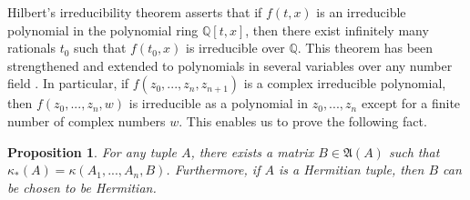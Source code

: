 \documentclass[draft, 12pt, reqno]{amsart}
\numberwithin{equation}{section}
\theoremstyle{plain}
\newtheorem{proposition}[theorem]{Proposition}
\begin{document}
Hilbert's irreducibility theorem asserts that if $f(t, x)$ is an irreducible polynomial in the polynomial ring $\mathbb{Q}[t,x]$, then there exist infinitely many rationals $t_0$ such that $f(t_0,x)$ is irreducible over ${\mathbb Q}$. This theorem has been strengthened and extended to polynomials in several variables over any number field \cite[Ch. 9]{Lan}. In particular, if $f(z_0, ..., z_n, z_{n+1})$ is a complex irreducible polynomial, then $f(z_0, ..., z_n, w)$ is irreducible as a polynomial in $z_0, ..., z_n$ except for a finite number of complex numbers $w$. This enables us to prove the following fact.

\begin{proposition}\label{N*}
For any tuple $A$, there exists a matrix $B\in \mathfrak{A}(A)$ such that $\kappa_*(A)=\kappa(A_1, ..., A_n, B)$. Furthermore, if $A$ is a Hermitian tuple, then $B$ can be chosen to be Hermitian.    \end{proposition}
    
\end{document}
